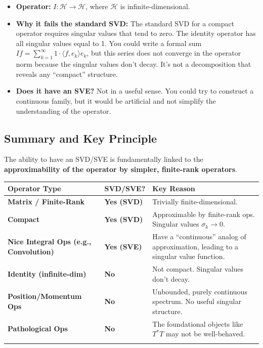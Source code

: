 \documentclass[aps,prl,reprint]{revtex4-2}
\begin{document}
\begin{itemize}
\item \textbf{Operator:} $I: \mathcal{H} \to \mathcal{H}$, where $\mathcal{H}
$ is infinite-dimensional.

\item \textbf{Why it fails the standard SVD:} The standard SVD for a compact
operator requires singular values that tend to zero. The identity operator
has all singular values equal to 1. You could write a formal sum $If =
\sum_{k=1}^\infty 1 \cdot \langle f, e_k \rangle e_k$, but this series does
not converge in the operator norm because the singular values don't decay.
It's not a decomposition that reveals any ``compact'' structure.

\item \textbf{Does it have an SVE?} Not in a useful sense. You could try to
construct a continuous family, but it would be artificial and not simplify
the understanding of the operator.
\end{itemize}

\subsection*{Summary and Key Principle}

The ability to have an SVD/SVE is fundamentally linked to the \textbf{%
approximability of the operator by simpler, finite-rank operators}.

\begin{table}[h]
\centering
\begin{tabular}{lll}
\textbf{Operator Type} & \textbf{SVD/SVE?} & \textbf{Key Reason} \\ \hline
\textbf{Matrix / Finite-Rank} & \textbf{Yes (SVD)} & Trivially
finite-dimensional. \\ 
\textbf{Compact} & \textbf{Yes (SVD)} & Approximable by finite-rank ops.
Singular values $\sigma_k \to 0$. \\ 
\textbf{Nice Integral Ops (e.g., Convolution)} & \textbf{Yes (SVE)} & Have a
``continuous'' analog of approximation, leading to a singular value function.
\\ 
\textbf{Identity (infinite-dim)} & \textbf{No} & Not compact. Singular
values don't decay. \\ 
\textbf{Position/Momentum Ops} & \textbf{No} & Unbounded, purely continuous
spectrum. No useful singular structure. \\ 
\textbf{Pathological Ops} & \textbf{No} & The foundational objects like $T^*T
$ may not be well-behaved. \\ 
&  & 
\end{tabular}%
\end{table}
\end{document}
